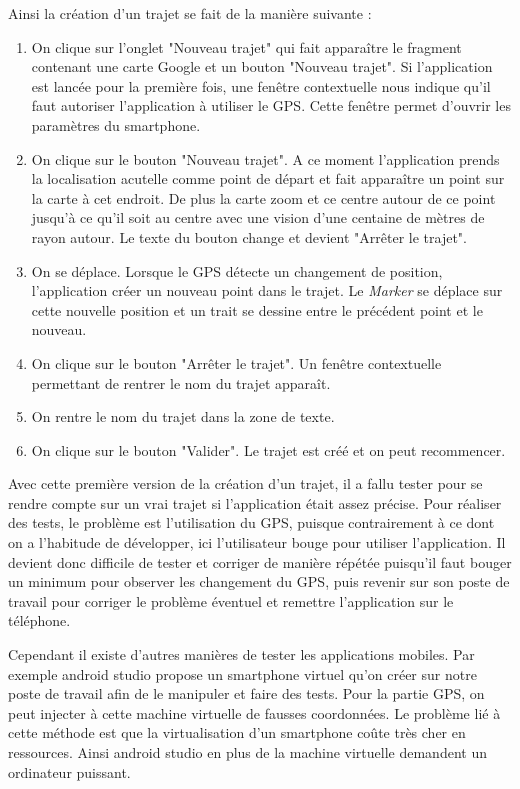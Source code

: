 Ainsi la création d'un trajet se fait de la manière suivante :
\begin{enumerate}
  \item On clique sur l'onglet "Nouveau trajet" qui fait apparaître le fragment contenant une carte Google et un bouton "Nouveau trajet".
  Si l'application est lancée pour la première fois, une fenêtre contextuelle nous indique qu'il faut autoriser l'application à utiliser le GPS.
  Cette fenêtre permet d'ouvrir les paramètres du smartphone.
  \item On clique sur le bouton "Nouveau trajet". A ce moment l'application prends la localisation acutelle comme point de départ et fait
  apparaître un point sur la carte à cet endroit. De plus la carte zoom et ce centre autour de ce point jusqu'à ce qu'il soit au centre
  avec une vision d'une centaine de mètres de rayon autour. Le texte du bouton change et devient "Arrêter le trajet".
  \item On se déplace. Lorsque le GPS détecte un changement de position, l'application créer un nouveau point dans le trajet. Le \emph{Marker}
  se déplace sur cette nouvelle position et un trait se dessine entre le précédent point et le nouveau.
  \item On clique sur le bouton "Arrêter le trajet". Un fenêtre contextuelle permettant de rentrer le nom du trajet apparaît.
  \item On rentre le nom du trajet dans la zone de texte.
  \item On clique sur le bouton "Valider". Le trajet est créé et on peut recommencer.
\end{enumerate}
\vspace{10pt}

Avec cette première version de la création d'un trajet, il a fallu tester pour se rendre compte sur un vrai trajet si l'application était
assez précise. Pour réaliser des tests, le problème est l'utilisation du GPS, puisque contrairement à ce dont on a l'habitude de développer,
ici l'utilisateur bouge pour utiliser l'application. Il devient donc difficile de tester et corriger de manière répétée puisqu'il faut bouger
un minimum pour observer les changement du GPS, puis revenir sur son poste de travail pour corriger le problème éventuel et remettre
l'application sur le téléphone.

Cependant il existe d'autres manières de tester les applications mobiles. Par exemple android studio propose
un smartphone virtuel qu'on créer sur notre poste de travail afin de le manipuler et faire des tests. Pour la partie GPS, on peut injecter
à cette machine virtuelle de fausses coordonnées. Le problème lié à cette méthode est que la virtualisation d'un smartphone coûte très cher
en ressources. Ainsi android studio en plus de la machine virtuelle demandent un ordinateur puissant.

